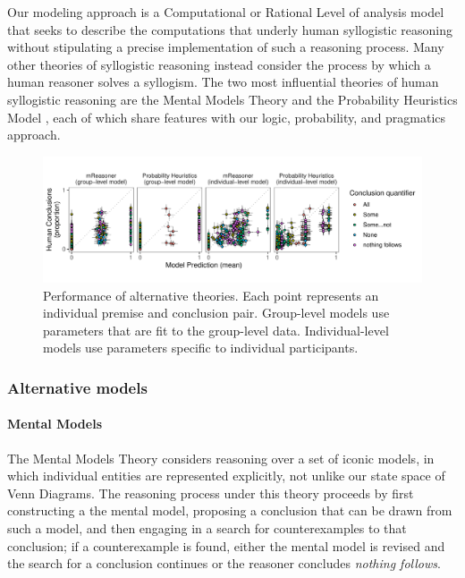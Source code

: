 \documentclass[floatsintext, doc]{apa6}
\newcommand{\ndg}[1]{{\textcolor{Green}{[ndg: #1]}}}
\begin{document}
Our modeling approach is a Computational or Rational Level of analysis model \cite{marr1982vision, anderson1990adaptive} that seeks to describe the computations that underly human syllogistic reasoning without stipulating a precise implementation of such a reasoning process. 
Many other theories of syllogistic reasoning instead consider the process by which a human reasoner solves a syllogism.
The two most influential theories of human syllogistic reasoning are the Mental Models Theory \cite{johnsonlaird2006we, khemlani2013processes} and the Probability Heuristics Model \cite{Chater1999}, each of which share features with our logic, probability, and pragmatics approach. 


\begin{figure}[t]
\centering
\includegraphics[width = \textwidth]{figs/alternative_model_scatters.pdf}
\caption{Performance of alternative theories. Each point represents an individual premise and conclusion pair. Group-level models use parameters that are fit to the group-level data. Individual-level models use parameters specific to individual participants. }
\label{fig:altModels}
\end{figure}

\subsubsection{Alternative models}

\paragraph{Mental Models}

The Mental Models Theory considers reasoning over a set of iconic models, in which individual entities are represented explicitly, not unlike our state space of Venn Diagrams. 
The reasoning process under this theory proceeds by first constructing a the mental model, proposing a conclusion that can be drawn from such a model, and then engaging in a search for counterexamples to that conclusion; if a counterexample is found, either the mental model is revised and the search for a conclusion continues or the reasoner concludes \emph{nothing follows}. 
\end{document}

